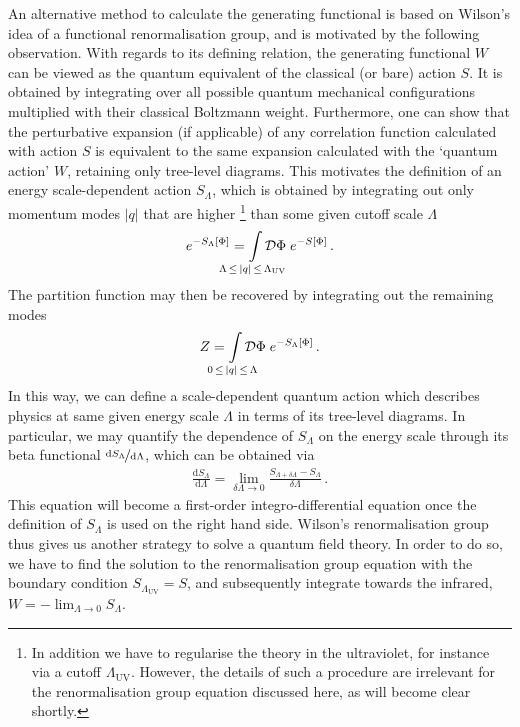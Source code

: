 \documentclass[11pt]{book}
\newcommand{\LambdaUV}{ \Lambda_{\scriptscriptstyle{\mathrm{UV}}} }
\newcommand{\SLambda}{ S_{\scriptscriptstyle{\Lambda}} }
\numberwithin{equation}{chapter}
\begin{document}
An alternative method to calculate the generating functional is based
on Wilson's idea of a functional renormalisation group, and is motivated
by the following observation. With regards to its defining relation,
the generating functional $W$ can be viewed as the quantum equivalent
of the classical (or bare) action $S$.
It is obtained by integrating over all possible quantum mechanical
configurations multiplied with their classical Boltzmann weight.
Furthermore, one can show that the perturbative expansion
(if applicable) of any correlation function
calculated with action $S$ is equivalent to the same expansion
calculated with the `quantum action' $W$, retaining only tree-level
diagrams. This motivates the definition of an energy scale-dependent
action $\SLambda$, which is obtained by integrating out
only momentum modes $|q|$ that are higher%
\footnote{%
  In addition we have to regularise the theory in the ultraviolet,
  for instance via a cutoff $\LambdaUV$. However, the details
  of such a procedure are irrelevant for the renormalisation group
  equation discussed here, as will become clear shortly.
}
than some given cutoff scale $\Lambda$
\begin{align}
  e^{ - \SLambda \lbrack \Phi \rbrack }
  = \smashoperator{ \int_{ \Lambda \, \leq \, |q| \, \leq \, \LambdaUV } }
  \mathcal D \Phi \;
  e^{-S \lbrack \Phi \rbrack} \,.
\end{align}
The partition function may then be recovered by integrating out
the remaining modes
\begin{align}
  Z
  = \smashoperator{ \int_{ 0 \, \leq \, |q| \, \leq \, \Lambda } }
  \mathcal D \Phi \;
  e^{-\SLambda \lbrack \Phi \rbrack} \,.
\end{align}
In this way, we can define a scale-dependent quantum action which
describes physics at same given energy scale $\Lambda$ in terms of
its tree-level diagrams. In particular, we may quantify the dependence
of $\SLambda$ on the energy scale through its
beta functional $\nicefrac{ \mathrm d\SLambda }{ \mathrm d\Lambda }$,
which can be obtained via
\begin{align}
  \frac{ \mathrm d \SLambda }{ \mathrm d \Lambda }
  = \lim_{ \delta \Lambda \rightarrow 0 }
  \frac{ S_{\scriptscriptstyle{\Lambda+\delta\Lambda}} - \SLambda }{ \delta \Lambda } \,.
  \label{eq:wilsonRG}
\end{align}
This equation will become a first-order integro-differential equation
once the definition of $\SLambda$ is used on the right hand side.
Wilson's renormalisation group thus gives us another strategy to
solve a quantum field theory. In order to do so, we have to find the solution to
the renormalisation group equation with the boundary condition
$S_\LambdaUV = S$,
and subsequently integrate towards the infrared,
$W = - \lim_{\Lambda \rightarrow 0} \SLambda$.
\end{document}
